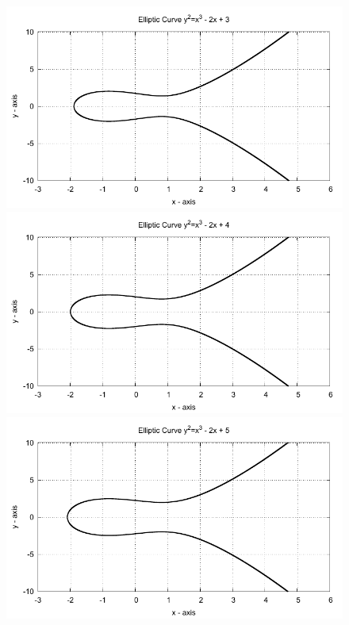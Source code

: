 \begin{figure}[!htbp]

  \begin{minipage}{0.3\textwidth} \centering
    \includegraphics{../Images/ecc_plot/25}
  \end{minipage}
  \begin{minipage}{0.3\textwidth} \centering
    \includegraphics{../Images/ecc_plot/26}
  \end{minipage}
  \begin{minipage}{0.3\textwidth} \centering
    \includegraphics{../Images/ecc_plot/27}
  \end{minipage}
\end{figure}

